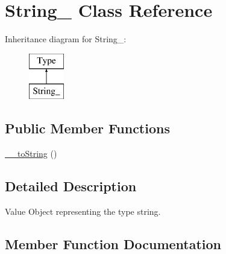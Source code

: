\hypertarget{classphp_documentor_1_1_reflection_1_1_types_1_1_string__}{}\section{String\+\_\+ Class Reference}
\label{classphp_documentor_1_1_reflection_1_1_types_1_1_string__}
Inheritance diagram for String\+\_\+\+:\begin{figure}[H]
\begin{center}
\leavevmode
\includegraphics[height=2.000000cm]{classphp_documentor_1_1_reflection_1_1_types_1_1_string__}
\end{center}
\end{figure}
\subsection*{Public Member Functions}
\begin{DoxyCompactItemize}
\item 
\mbox{\hyperlink{classphp_documentor_1_1_reflection_1_1_types_1_1_string___a7516ca30af0db3cdbf9a7739b48ce91d}{\+\_\+\+\_\+to\+String}} ()
\end{DoxyCompactItemize}


\subsection{Detailed Description}
Value Object representing the type \textquotesingle{}string\textquotesingle{}. 

\subsection{Member Function Documentation}
\mbox{\label{classphp_documentor_1_1_reflection_1_1_types_1_1_string___a7516ca30af0db3cdbf9a7739b48ce91d}} 
